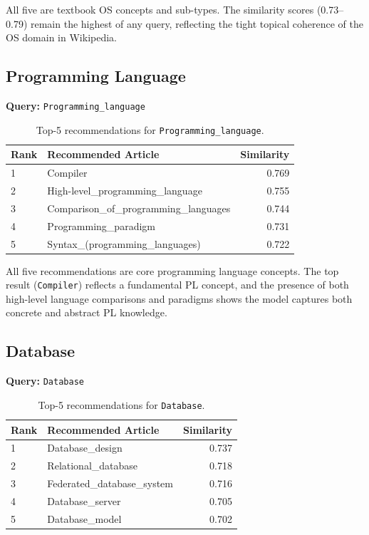 \documentclass[12pt,a4paper]{article}
\begin{document}
All five are textbook OS concepts and sub-types.  The similarity scores
(0.73--0.79) remain the highest of any query, reflecting the tight topical
coherence of the OS domain in Wikipedia.

\subsection{Programming Language}

\textbf{Query:} \texttt{Programming\_language}

\begin{table}[H]
\centering
\caption{Top-5 recommendations for \texttt{Programming\_language}.}
\label{tab:pl}
\begin{tabular}{llr}
\toprule
\textbf{Rank} & \textbf{Recommended Article} & \textbf{Similarity} \\
\midrule
1 & Compiler & 0.769 \\
2 & High-level\_programming\_language & 0.755 \\
3 & Comparison\_of\_programming\_languages & 0.744 \\
4 & Programming\_paradigm & 0.731 \\
5 & Syntax\_(programming\_languages) & 0.722 \\
\bottomrule
\end{tabular}
\end{table}

All five recommendations are core programming language concepts.  The top result
(\texttt{Compiler}) reflects a fundamental PL concept, and the presence of
both high-level language comparisons and paradigms shows the model captures
both concrete and abstract PL knowledge.

\subsection{Database}

\textbf{Query:} \texttt{Database}

\begin{table}[H]
\centering
\caption{Top-5 recommendations for \texttt{Database}.}
\label{tab:db}
\begin{tabular}{llr}
\toprule
\textbf{Rank} & \textbf{Recommended Article} & \textbf{Similarity} \\
\midrule
1 & Database\_design & 0.737 \\
2 & Relational\_database & 0.718 \\
3 & Federated\_database\_system & 0.716 \\
4 & Database\_server & 0.705 \\
5 & Database\_model & 0.702 \\
\bottomrule
\end{tabular}
\end{table}
\end{document}
